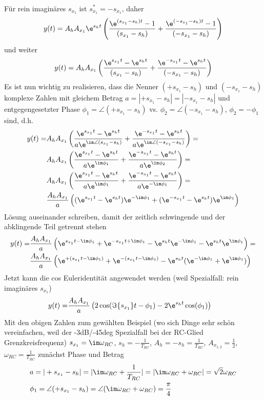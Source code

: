 \begin{ExCalc}
\begin{align}
\end{align}
Für rein imaginäres $s_{x_{1}}$ ist $s^*_{x_{1}} = -s_{x_{1}}$, daher
\begin{align}
y(t) = A_h A_{x_{1}} \e^{s_h t}  \left(\frac{\e^{(s_{x_{1}}-s_h) t}-1}{(s_{x_{1}}-s_h)}+\frac{\e^{(-s_{x_{1}}-s_h) t}-1}{(-s_{x_{1}}-s_h)}\right)
\end{align}
und weiter
\begin{align}
y(t) = A_h A_{x_{1}} \left(\frac{\e^{s_{x_{1}} t}-\e^{s_h t}}{(s_{x_{1}}-s_h)}+\frac{\e^{-s_{x_{1}} t}-\e^{s_h t}}{(-s_{x_{1}}-s_h)}\right)
\end{align}
%
Es ist nun wichtig zu realisieren, dass die Nenner
$(+s_{x_{1}}-s_h)$ und $(-s_{x_{1}}-s_h)$ komplexe Zahlen mit gleichem Betrag $a = |+s_{x_{1}}-s_h| = |-s_{x_{1}}-s_h|$ und entgegengesetzter Phase
$\phi_1 = \angle (+s_{x_{1}}-s_h)$ vs. $\phi_2 = \angle (-s_{x_{1}}-s_h)$, $\phi_2 = -\phi_1$ sind, d.h.
%
\begin{align}
y(t) =& A_h A_{x_{1}} \left(\frac{\e^{s_{x_{1}} t}-\e^{s_h t}}{a \e^{\im\angle(s_{x_{1}}-s_h)}}+\frac{\e^{-s_{x_{1}} t}-\e^{s_h t}}{a \e^{\im\angle(-s_{x_{1}}-s_h)}}\right)=\\
& A_h A_{x_{1}} \left(\frac{\e^{s_{x_{1}} t}-\e^{s_h t}}{a \e^{\im\phi_1}}+\frac{\e^{-s_{x_{1}} t}-\e^{s_h t}}{a \e^{\im\phi_2}}\right)=\\
& A_h A_{x_{1}} \left(\frac{\e^{s_{x_{1}} t}-\e^{s_h t}}{a \e^{\im\phi_1}}+\frac{\e^{-s_{x_{1}} t}-\e^{s_h t}}{a \e^{-\im\phi_1}}\right)=\\
& \frac{A_h A_{x_{1}}}{a} \left((\e^{s_{x_{1}} t}-\e^{s_h t})\e^{-\im\phi_1}+(\e^{-s_{x_{1}} t}-\e^{s_h t})\e^{\im\phi_1}\right)
\end{align}
Lösung auseinander schreiben, damit der zeitlich schwingende und der abklingende Teil getrennt stehen
\begin{align}
y(t) =& \frac{A_h A_{x_{1}}}{a} \left(\e^{s_{x_{1}} t-\im\phi_1}+\e^{-s_{x_{1}} t+\im\phi_1}-\e^{s_h t}\e^{-\im\phi_1}-\e^{s_h t}\e^{\im\phi_1}\right)=\\
& \frac{A_h A_{x_{1}}}{a} \left(\e^{+(s_{x_{1}} t-\im\phi_1)}+\e^{-(s_{x_{1}} t-\im\phi_1)}-\e^{s_h t}(\e^{-\im\phi_1}+\e^{\im\phi_1})\right)
\end{align}
Jetzt kann die cos Euleridentität angewendet werden (weil Spezialfall: rein imaginäres $s_{x_{1}}$)
\begin{align}
y(t) = & \frac{A_h A_{x_{1}}}{a} \left(2\cos(\Im\{s_{x_{1}}\} t-\phi_1)-2\e^{s_h t}\cos(\phi_1)\right)
\end{align}
%
Mit den obigen Zahlen zum gewählten Beispiel (wo sich Dinge sehr schön vereinfachen, weil der -3dB/-45deg Spezialfall bei der RC-Glied Grenzkreisfrequenz) $s_{x_{1}} = \im\omega_{RC}$, $s_h = -\frac{1}{T_{RC}}$, $A_h = -s_h = \frac{1}{T_{RC}}$, $A_{x_{1,2}}=\frac{1}{2}$, $\omega_{RC} = \frac{1}{T_{RC}}$
zunächst Phase und Betrag
\begin{align}
&a = |+s_{x_{1}}-s_h| = |\im\omega_{RC} + \frac{1}{T_{RC}}| = |\im\omega_{RC} + \omega_{RC}| = \sqrt{2}\omega_{RC}\\
&\phi_1 = \angle (+s_{x_{1}}-s_h) = \angle (\im\omega_{RC} + \omega_{RC}) = \frac{\pi}{4}
\end{align}
\end{ExCalc}
